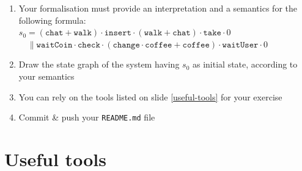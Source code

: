\documentclass[presentation]{beamer}\mode<presentation>{\usetheme{AMSCesenaPurpleAndGold}}
\begin{document}
\begin{frame}[allowframebreaks]
\begin{enumerate}
        \item Your formalisation must provide an interpretation and a semantics for the following formula:
        \\\vspace{.1cm}
        \alert{$
            s_0 = (\mathtt{chat} + \mathtt{walk}) \cdot \mathtt{insert} \cdot (\mathtt{walk} + \mathtt{chat}) \cdot \mathtt{take} \cdot 0
        $\\\hfill$    
            \quad\parallel
            \mathtt{waitCoin} \cdot \mathtt{check} \cdot (\mathtt{change} \cdot \mathtt{coffee} + \mathtt{coffee}) \cdot \mathtt{waitUser} \cdot 0
        $}
        
        \item Draw the state graph of the system having $s_0$ as initial state, according to your semantics
        
        \item You can rely on the tools listed on slide \ref{useful-tools} for your exercise
        
        \item Commit \& push your \texttt{README.md} file
        
    \end{enumerate}
    

\end{frame}

\section{Useful tools}
\end{document}
